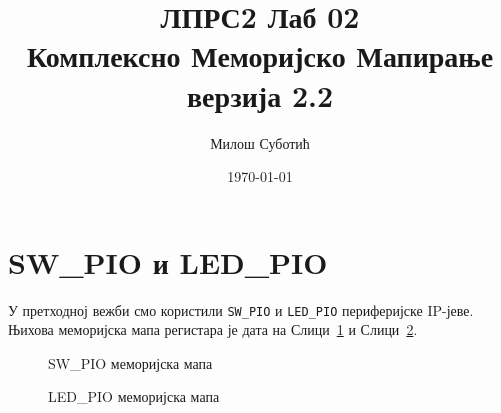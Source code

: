 \documentclass[12pt]{article}
\title{
	ЛПРС2 Лаб 02\\
	{\normalsize Комплексно Меморијско Мапирање}\\
	{\small верзија 2.2}
}
\author{Милош Суботић}
\date{\today}
\def\regWD{-4mm}
\def\regHO{-30mm}
\def\regH{-13mm}
\def\regRWO{\regH-0mm}
\def\regIVO{\regRWO-5mm}
\newcommand{\regBitLegend}[1]{%
	\node[anchor=south east] at (32*\regWD, #1*\regHO) {Bits};
}
\newcommand{\regBit}[2]{%
	\node[anchor=south] at (#2*\regWD+0.5*\regWD, #1*\regHO) {#2};
}
\newcommand{\regAddr}[2]{%
	\node[anchor=east] at (32*\regWD, #1*\regHO+0.5*\regH) {#2};
}
\newcommand{\regField}[4]{%
	\draw (#2*\regWD+\regWD, #1*\regHO) rectangle (#3*\regWD, #1*\regHO+\regH)
		node[pos=.5] {#4};
}
\newcommand{\regRWLegend}[1]{%
	\node[anchor=north east] at (32*\regWD, #1*\regHO+\regRWO) {Read/Write};
}
\newcommand{\regRW}[4]{%
	\node[anchor=north] at 
		(
			#2*0.5*\regWD + #3*0.5*\regWD + 0.5*\regWD,
			#1*\regHO+\regRWO
		)
		{#4};
}
\newcommand{\regInitLegend}[1]{%
	\node[anchor=north east] at (32*\regWD, #1*\regHO+\regIVO) {Intial Value};
}
\newcommand{\regInit}[4]{%
	\node[anchor=north] at 
		(
			#2*0.5*\regWD + #3*0.5*\regWD + 0.5*\regWD,
			#1*\regHO+\regIVO
		)
		{#4};
}
\newcommand{\regStd}[2]{%
	\regBitLegend{#1}
	\regAddr{#1}{#2}
	\regRWLegend{#1}
	\regInitLegend{#1}
	\regBit{#1}{31}
	\regBit{#1}{0}
}
\begin{document}
\sloppy %



\clearpage
\maketitle
\thispagestyle{empty}


\section{SW\_PIO и LED\_PIO}
\par
У претходној вежби смо користили \verb|SW_PIO| и \verb|LED_PIO|
периферијске IP-јеве.
Њихова меморијска мапа регистара је дата на
Слици~\ref{fig:sw_pio_mm} и Слици~\ref{fig:led_pio_mm}.

\begin{figure}[H]
	\centering
	
	\caption{\textsc{SW\_PIO} меморијска мапа}
	\label{fig:sw_pio_mm}
\end{figure}

\begin{figure}[H]
	\centering
	
	\caption{\textsc{LED\_PIO} меморијска мапа}
	\label{fig:led_pio_mm}
\end{figure}
\end{document}
